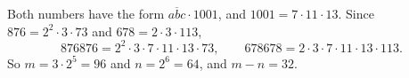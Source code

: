 Both numbers have the form $\overline{abc}\cdot1001$, and $1001=7\cdot11\cdot13$. Since $876=2^2\cdot3\cdot73$ and $678=2\cdot3\cdot113$,
\[876876=2^2\cdot3\cdot7\cdot11\cdot13\cdot73,\qquad 678678=2\cdot3\cdot7\cdot11\cdot13\cdot113.\]
So $m=3\cdot2^5=96$ and $n=2^6=64$, and $m-n=\boxed{32}$.
